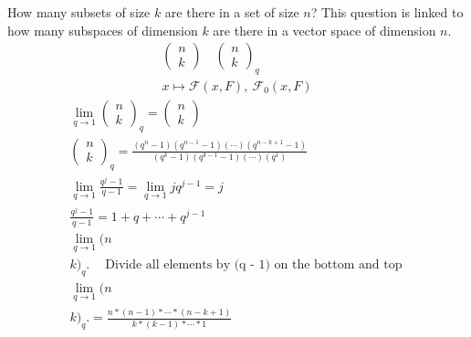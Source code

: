 \documentclass[class=scrartcl, crop=false]{standalone}
\begin{document}
How many subsets of size $k$ are there in a set of size $n$? This question is linked to how many subspaces of dimension $k$ are there in a vector space of dimension $n$.
\begin{gather*}
  \begin{pmatrix}
    n \\ k
  \end{pmatrix} \quad
  \begin{pmatrix}
    n \\ k
  \end{pmatrix}_q
  \\
  x \mapsto \mathcal{F}(x, F), \ \mathcal{F}_0(x, F)
\end{gather*} 
\begin{gather*}
  \lim_{q \to 1}
  \begin{pmatrix}
    n \\ k
  \end{pmatrix}_q
  =
  \begin{pmatrix}
    n \\ k
  \end{pmatrix} 
  \\
  \begin{pmatrix}
    n \\ k
  \end{pmatrix}_q
  = 
  \frac{(q^n - 1)(q^{n - 1} - 1)(\cdots)(q^{n - k + 1} - 1)}{(q^k - 1)(q^{k - 1} - 1)(\cdots)(q^1)} \\
  \lim_{q \to 1}\frac{q^j - 1}{q - 1} = \lim_{q \to 1}jq^{j - 1} = j \\
  \frac{q^j - 1}{q - 1} = 1 + q + \cdots + q^{j - 1} \\
  \lim_{q \to 1}(n \\ k)_q. \quad \ \text{Divide all elements by (q - 1) on the bottom and top} \  \\
  \lim_{q \to 1}(n \\ k)_q. = \frac{n * (n - 1) * \cdots * (n - k + 1)}{k * (k - 1) * \cdots * 1}
\end{gather*} 
\end{document}
